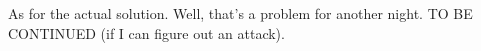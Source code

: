 As for the actual solution.  Well, that's a problem for another night.  TO BE CONTINUED (if I can figure out an attack).

%
%
%
%
%
%
%
%
%
%
%
%
%
%
%
%
